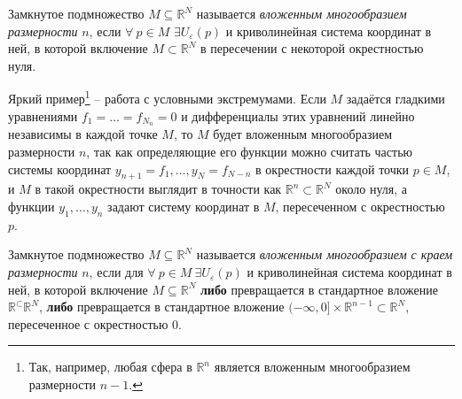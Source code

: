 \begin{to_def} 
    Замкнутое подмножество $M \subseteq \mathbb{R}^N$ называется \textit{вложенным многообразием размерности} $n$, если $\forall \ p \in M$ $\exists U_{\varepsilon}(p)$ и криволинейная система координат в ней, в которой включение $M \subset \mathbb{R}^N$ в пересечении с некоторой окрестностью нуля.
\end{to_def}

Яркий пример\footnote{
    Так, например, любая сфера в $\mathbb{R}^n$ является вложенным многообразием размерности $n-1$.
} -- работа с условными экстремумами. Если $M$ задаётся гладкими уравнениями $f_1 = \ldots = f_{N_n} = 0$ и дифференциалы этих уравнений линейно независимы в каждой точке $M$, то $M$ будет вложенным многообразием размерности $n$, так как определяющие его функции можно считать частью системы координат $y_{n+1}=f_1,\ldots,y_N=f_{N-n}$ в окрестности каждой точки $p \in M$, и $M$ в такой окрестности выглядит в точности как $\mathbb{R}^n \subset \mathbb{R}^N$ около нуля, а функции $y_1,\ldots,y_n$ задают систему координат в $M$, пересеченном с окрестностью $p$.


\begin{to_def} 
    Замкнутое подмножество $M \subseteq \mathbb{R}^N$ называется \textit{вложенным многообразием с краем размерности} $n$, если для $\forall \ p \in M \ \exists U_{\varepsilon}(p)$ и криволинейная система координат в ней, в которой включение $M \subseteq \mathbb{R}^N$ \textbf{либо} превращается в стандартное вложение $\mathbb{R}^ \subset \mathbb{R}^N$, \textbf{либо} превращается в стандартное вложение $(-\infty, 0] \times \mathbb{R}^{n-1} \subset \mathbb{R}^N$, пересеченное с окрестностью 0.
\end{to_def}